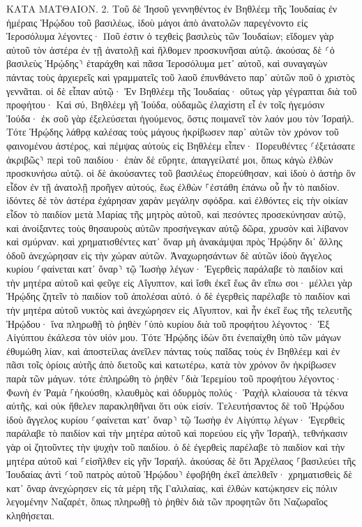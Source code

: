 \documentclass[twoside, 9pt]{extreport}
\begin{document}
ΚΑΤΑ ΜΑΤΘΑΙΟΝ.
2.
Τοῦ δὲ Ἰησοῦ γεννηθέντος ἐν Βηθλέεμ τῆς Ἰουδαίας ἐν ἡμέραις Ἡρῴδου τοῦ βασιλέως, ἰδοὺ μάγοι ἀπὸ ἀνατολῶν παρεγένοντο εἰς Ἱεροσόλυμα 
λέγοντες· Ποῦ ἐστιν ὁ τεχθεὶς βασιλεὺς τῶν Ἰουδαίων; εἴδομεν γὰρ αὐτοῦ τὸν ἀστέρα ἐν τῇ ἀνατολῇ καὶ ἤλθομεν προσκυνῆσαι αὐτῷ. 
ἀκούσας δὲ ⸂ὁ βασιλεὺς Ἡρῴδης⸃ ἐταράχθη καὶ πᾶσα Ἱεροσόλυμα μετ᾽ αὐτοῦ, 
καὶ συναγαγὼν πάντας τοὺς ἀρχιερεῖς καὶ γραμματεῖς τοῦ λαοῦ ἐπυνθάνετο παρ᾽ αὐτῶν ποῦ ὁ χριστὸς γεννᾶται. 
οἱ δὲ εἶπαν αὐτῷ· Ἐν Βηθλέεμ τῆς Ἰουδαίας· οὕτως γὰρ γέγραπται διὰ τοῦ προφήτου· 
Καὶ σύ, Βηθλέεμ γῆ Ἰούδα, οὐδαμῶς ἐλαχίστη εἶ ἐν τοῖς ἡγεμόσιν Ἰούδα· ἐκ σοῦ γὰρ ἐξελεύσεται ἡγούμενος, ὅστις ποιμανεῖ τὸν λαόν μου τὸν Ἰσραήλ. 
Τότε Ἡρῴδης λάθρᾳ καλέσας τοὺς μάγους ἠκρίβωσεν παρ᾽ αὐτῶν τὸν χρόνον τοῦ φαινομένου ἀστέρος, 
καὶ πέμψας αὐτοὺς εἰς Βηθλέεμ εἶπεν· Πορευθέντες ⸂ἐξετάσατε ἀκριβῶς⸃ περὶ τοῦ παιδίου· ἐπὰν δὲ εὕρητε, ἀπαγγείλατέ μοι, ὅπως κἀγὼ ἐλθὼν προσκυνήσω αὐτῷ. 
οἱ δὲ ἀκούσαντες τοῦ βασιλέως ἐπορεύθησαν, καὶ ἰδοὺ ὁ ἀστὴρ ὃν εἶδον ἐν τῇ ἀνατολῇ προῆγεν αὐτούς, ἕως ἐλθὼν ⸀ἐστάθη ἐπάνω οὗ ἦν τὸ παιδίον. 
ἰδόντες δὲ τὸν ἀστέρα ἐχάρησαν χαρὰν μεγάλην σφόδρα. 
καὶ ἐλθόντες εἰς τὴν οἰκίαν εἶδον τὸ παιδίον μετὰ Μαρίας τῆς μητρὸς αὐτοῦ, καὶ πεσόντες προσεκύνησαν αὐτῷ, καὶ ἀνοίξαντες τοὺς θησαυροὺς αὐτῶν προσήνεγκαν αὐτῷ δῶρα, χρυσὸν καὶ λίβανον καὶ σμύρναν. 
καὶ χρηματισθέντες κατ᾽ ὄναρ μὴ ἀνακάμψαι πρὸς Ἡρῴδην δι᾽ ἄλλης ὁδοῦ ἀνεχώρησαν εἰς τὴν χώραν αὐτῶν. 
Ἀναχωρησάντων δὲ αὐτῶν ἰδοὺ ἄγγελος κυρίου ⸂φαίνεται κατ᾽ ὄναρ⸃ τῷ Ἰωσὴφ λέγων· Ἐγερθεὶς παράλαβε τὸ παιδίον καὶ τὴν μητέρα αὐτοῦ καὶ φεῦγε εἰς Αἴγυπτον, καὶ ἴσθι ἐκεῖ ἕως ἂν εἴπω σοι· μέλλει γὰρ Ἡρῴδης ζητεῖν τὸ παιδίον τοῦ ἀπολέσαι αὐτό. 
ὁ δὲ ἐγερθεὶς παρέλαβε τὸ παιδίον καὶ τὴν μητέρα αὐτοῦ νυκτὸς καὶ ἀνεχώρησεν εἰς Αἴγυπτον, 
καὶ ἦν ἐκεῖ ἕως τῆς τελευτῆς Ἡρῴδου· ἵνα πληρωθῇ τὸ ῥηθὲν ⸀ὑπὸ κυρίου διὰ τοῦ προφήτου λέγοντος· Ἐξ Αἰγύπτου ἐκάλεσα τὸν υἱόν μου. 
Τότε Ἡρῴδης ἰδὼν ὅτι ἐνεπαίχθη ὑπὸ τῶν μάγων ἐθυμώθη λίαν, καὶ ἀποστείλας ἀνεῖλεν πάντας τοὺς παῖδας τοὺς ἐν Βηθλέεμ καὶ ἐν πᾶσι τοῖς ὁρίοις αὐτῆς ἀπὸ διετοῦς καὶ κατωτέρω, κατὰ τὸν χρόνον ὃν ἠκρίβωσεν παρὰ τῶν μάγων. 
τότε ἐπληρώθη τὸ ῥηθὲν ⸀διὰ Ἰερεμίου τοῦ προφήτου λέγοντος· 
Φωνὴ ἐν Ῥαμὰ ⸀ἠκούσθη, κλαυθμὸς καὶ ὀδυρμὸς πολύς· Ῥαχὴλ κλαίουσα τὰ τέκνα αὐτῆς, καὶ οὐκ ἤθελεν παρακληθῆναι ὅτι οὐκ εἰσίν. 
Τελευτήσαντος δὲ τοῦ Ἡρῴδου ἰδοὺ ἄγγελος κυρίου ⸂φαίνεται κατ᾽ ὄναρ⸃ τῷ Ἰωσὴφ ἐν Αἰγύπτῳ 
λέγων· Ἐγερθεὶς παράλαβε τὸ παιδίον καὶ τὴν μητέρα αὐτοῦ καὶ πορεύου εἰς γῆν Ἰσραήλ, τεθνήκασιν γὰρ οἱ ζητοῦντες τὴν ψυχὴν τοῦ παιδίου. 
ὁ δὲ ἐγερθεὶς παρέλαβε τὸ παιδίον καὶ τὴν μητέρα αὐτοῦ καὶ ⸀εἰσῆλθεν εἰς γῆν Ἰσραήλ. 
ἀκούσας δὲ ὅτι Ἀρχέλαος ⸀βασιλεύει τῆς Ἰουδαίας ἀντὶ ⸂τοῦ πατρὸς αὐτοῦ Ἡρῴδου⸃ ἐφοβήθη ἐκεῖ ἀπελθεῖν· χρηματισθεὶς δὲ κατ᾽ ὄναρ ἀνεχώρησεν εἰς τὰ μέρη τῆς Γαλιλαίας, 
καὶ ἐλθὼν κατῴκησεν εἰς πόλιν λεγομένην Ναζαρέτ, ὅπως πληρωθῇ τὸ ῥηθὲν διὰ τῶν προφητῶν ὅτι Ναζωραῖος κληθήσεται. 
\end{document}
